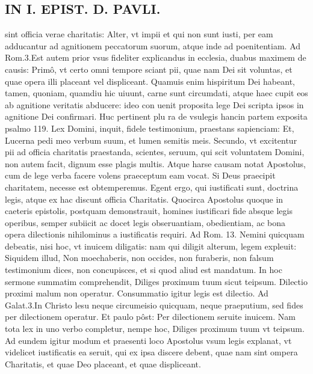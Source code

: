 \documentclass{article}
\begin{document}
\begin{pages}
\section*{IN I. EPIST. D. PAVLI. }
\marginpar{[ p.25 ]}\pstart sint officia verae charitatis: Alter, vt impii et qui non sunt iusti, per eam adducantur ad agnitionem peccatorum suorum, atque  inde ad poenitentiam. Ad Rom.3.Est autem prior vsus fideliter explicandus in ecclesia, duabus maximem de causis: Primô, vt certo omni tempore sciant pii, quae nam Dei sit voluntas, et quae opera illi placeant vel displiceant. Quamuis enim hispiritum Dei habeant, tamen, quoniam, quamdiu hic uiuunt, carne sunt circumdati, atque haec cupit eos ab agnitione veritatis abducere: ideo con uenit proposita lege Dei scripta ipsos in agnitione Dei confirmari. Huc pertinent plu ra de vsulegis hancin partem exposita psalmo 119. Lex Domini, inquit, fidele testimonium, praestans sapienciam: Et, Lucerna pedi meo verbum suum, et lumen semitis meis. Secundo, vt excitentur pii ad officia charitatis praestanda, scientes, seruum, qui scit voluntatem Domini, non autem facit, dignum esse plagis multis. Atque harse causam notat Apostolus, cum de lege verba facere volens praeceptum eam vocat. Si Deus praecipit charitatem, necesse est obtemperemus. Egent ergo, qui iustificati sunt, doctrina legis, atque  ex hac discunt officia Charitatis. Quocirca Apostolus quoque in caeteris epistolis, postquam demonstrauit, homines iustificari fide absque  legis operibus, semper subiicit ac docet legis obseruantiam, obedientiam, ac bona opera dilectionis nihilominus a iustificatis requiri. Ad Rom. 13. Nemini quicquam debeatis, nisi hoc, vt inuicem diligatis: nam qui diligit alterum, legem expleuit: Siquidem illud, Non moechaberis, non occides, non furaberis, non falsum testimonium dices, non concupisces, et si quod aliud est mandatum. In hoc sermone summatim comprehendit, Diliges proximum tuum sicut teipsum. Dilectio proximi malum non operatur. Consummatio igitur legis est dilectio. Ad Galat.3.In Christo lesu neque circumeisio quicquam, neque praeputium, sed fides per dilectionem operatur. Et paulo pôst: Per dilectionem seruite inuicem. Nam tota lex in uno verbo completur, nempe hoc, Diliges proximum tuum vt teipsum. Ad eundem igitur modum et praesenti loco Apostolus vsum legis explanat, vt videlicet iustificatis ea seruit, qui ex ipsa discere debent, quae nam sint ompera Charitatis, et quae Deo placeant, et quae displiceant.  \pend
{}
{}

\end{pages}
\end{document}
